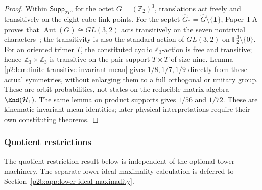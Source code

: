 \documentclass[11pt,a4paper]{article}
\begin{document}
\begin{proof}
Within \(\mathsf{Supp}_{2T}\), for the octet
\(G=(\mathbb Z_2)^3\), translations act freely and transitively
on the eight cube-link points.  For the septet
\(\widehat G_*=\widehat G\setminus\{\mathbf1\}\), Paper~I-A proves that
\(\operatorname{Aut}(G)\cong GL(3,2)\) acts transitively on the seven
nontrivial characters~\cite{Kugelmann2026a}; the transitivity is also the
standard action of \(GL(3,2)\) on \(\mathbb F_2^3\setminus\{0\}\).  For an oriented trimer \(T\), the constituted cyclic
\(\mathbb Z_3\)-action is free and transitive; hence
\(\mathbb Z_3\times\mathbb Z_3\) is transitive on the pair support
\(T\times T\) of size nine.  Lemma~
\ref{p2:lem:finite-transitive-invariant-mean} gives \(1/8,1/7,1/9\)
directly from these actual symmetries, without enlarging them to a full
orthogonal or unitary group.  These are orbit probabilities, not states on
the reducible matrix algebra \(\End(\mathcal H_1)\).  The same lemma on product supports gives
\(1/56\) and \(1/72\).  These are kinematic invariant-mean identities; later
physical interpretations require their own constituting theorems.
\end{proof}



\subsubsection{Quotient restrictions}
The quotient-restriction result below is independent of the optional
tower machinery.  The separate lower-ideal maximality calculation is deferred
to Section~\ref{p2b:app:lower-ideal-maximality}.
\end{document}
